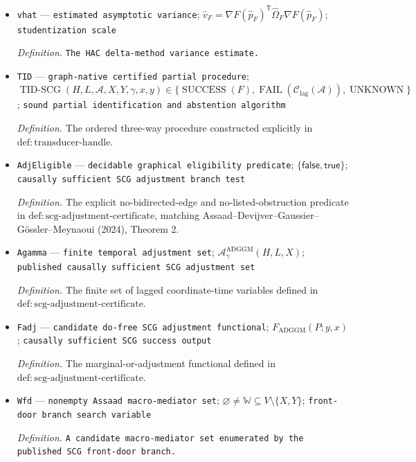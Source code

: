 \documentclass{article}
\begin{document}
\begin{itemize}
  \item \texttt{vhat} --- \texttt{estimated asymptotic variance}; \(\widehat v_F=\nabla F(\widehat p_F)^{\mathsf T}\widehat\Omega_F\nabla F(\widehat p_F)\); \texttt{studentization scale}
  \par\smallskip\noindent\emph{Definition.} \texttt{The HAC delta-\allowbreak{}method variance estimate.}
  \item \texttt{TID} --- \texttt{graph-\allowbreak{}native certified partial procedure}; \(\operatorname{TID\text{-}SCG}(H,L,\mathcal A,X,Y,\gamma,x,y)\in\{\operatorname{SUCCESS}(F),\operatorname{FAIL}(\mathcal C_{\mathrm{lag}}(\mathcal A)),\operatorname{UNKNOWN}\}\); \texttt{sound partial identification and abstention algorithm}
  \par\smallskip\noindent\emph{Definition.} The ordered three-way procedure constructed explicitly in \(\mathrm{def:transducer\text{-}handle}\).
  \item \texttt{AdjEligible} --- \texttt{decidable graphical eligibility predicate}; \(\{\mathsf{false},\mathsf{true}\}\); \texttt{causally sufficient SCG adjustment branch test}
  \par\smallskip\noindent\emph{Definition.} The explicit no-bidirected-edge and no-listed-obstruction predicate in \(\mathrm{def:scg\text{-}adjustment\text{-}certificate}\), matching Assaad--Devijver--Gaussier--G\"ossler--Meynaoui (2024), Theorem 2.
  \item \texttt{Agamma} --- \texttt{finite temporal adjustment set}; \(\mathcal A_{\gamma}^{\mathrm{ADGGM}}(H,L,X)\); \texttt{published causally sufficient SCG adjustment set}
  \par\smallskip\noindent\emph{Definition.} The finite set of lagged coordinate-time variables defined in \(\mathrm{def:scg\text{-}adjustment\text{-}certificate}\).
  \item \texttt{Fadj} --- \texttt{candidate do-\allowbreak{}free SCG adjustment functional}; \(F_{\mathrm{ADGGM}}(P;y,x)\); \texttt{causally sufficient SCG success output}
  \par\smallskip\noindent\emph{Definition.} The marginal-or-adjustment functional defined in \(\mathrm{def:scg\text{-}adjustment\text{-}certificate}\).
  \item \texttt{Wfd} --- \texttt{nonempty Assaad macro-\allowbreak{}mediator set}; \(\varnothing\ne\mathbb W\subseteq V\setminus\{X,Y\}\); \texttt{front-\allowbreak{}door branch search variable}
  \par\smallskip\noindent\emph{Definition.} \texttt{A candidate macro-\allowbreak{}mediator set enumerated by the published SCG front-\allowbreak{}door branch.}

\end{itemize}
\end{document}
